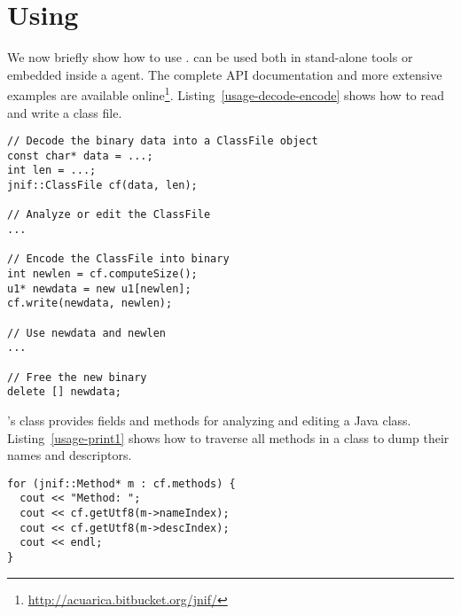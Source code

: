 \section{Using \jnif{}}
\label{sec:jnif-usage}

 

\lstset{style=mystyle}
\lstset{escapechar=§}

We now briefly show how to use \jnif{}.
\jnif{} can be used both in stand-alone tools or
embedded inside a \jvmti{} agent.
The complete API documentation and more extensive examples are available online\footnote{\url{http://acuarica.bitbucket.org/jnif/}}.
Listing~\ref{usage-decode-encode} shows how to read and write a class file.

\begin{lstlisting}[caption=Decoding and encoding a class,label=usage-decode-encode]
// Decode the binary data into a ClassFile object
const char* data = ...;
int len = ...;
jnif::ClassFile cf(data, len);

// Analyze or edit the ClassFile
...

// Encode the ClassFile into binary
int newlen = cf.computeSize();
u1* newdata = new u1[newlen];
cf.write(newdata, newlen);

// Use newdata and newlen
...

// Free the new binary
delete [] newdata;
\end{lstlisting}

\jnif{}'s  class provides fields and methods for analyzing and editing a Java class.
Listing~\ref{usage-print1} shows how to traverse all methods in a class
to dump their names and descriptors.

\begin{lstlisting}[caption=Traversing all methods in a class,label=usage-print1]
for (jnif::Method* m : cf.methods) {
  cout << "Method: ";
  cout << cf.getUtf8(m->nameIndex);
  cout << cf.getUtf8(m->descIndex);
  cout << endl;
}
\end{lstlisting}


